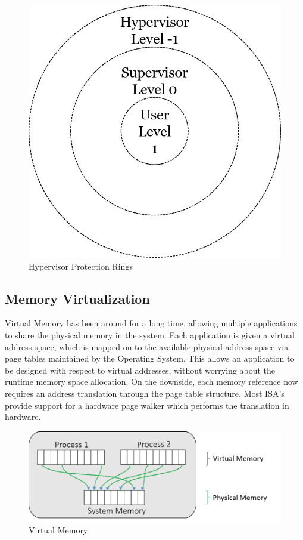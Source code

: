 \begin{figure}[H]
  \centering
  \includegraphics[scale=0.6]{figures/protect_hyper.png}
  \caption{Hypervisor Protection Rings}
  \label{fig:hyper_rings}
\end{figure}

\subsection{Memory Virtualization}

Virtual Memory has been around for a long time, allowing multiple applications to share the physical memory in the system. Each application is given a virtual address space, which is mapped on to the available physical address space via page tables maintained by the Operating System. This allows an application to be designed with respect to virtual addresses, without worrying about the runtime memory space allocation. On the downside, each memory reference now requires an address translation through the page table structure. Most ISA’s provide support for a hardware page walker which performs the translation in hardware. 


\setlength{\belowcaptionskip}{-10pt}

\begin{figure}[H]
  \centering
  \includegraphics[scale=0.6]{figures/virt_mem.png}
  \caption{Virtual Memory}
  \label{fig:virt_mem}
\end{figure}



